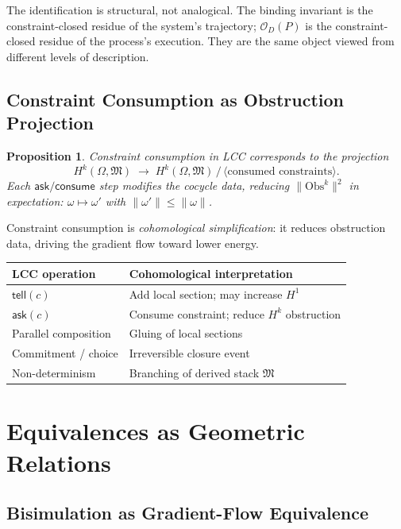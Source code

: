 \documentclass[11pt, letterpaper]{article}
\theoremstyle{plain}
\newtheorem{proposition}[theorem]{Proposition}
\theoremstyle{definition}
\theoremstyle{remark}
\newcommand{\MM}{\mathfrak{M}}
\newcommand{\OO}{\mathcal{O}}
\newcommand{\Obs}{\mathrm{Obs}}
\begin{document}
The identification is structural, not analogical. The binding invariant is the
constraint-closed residue of the system's trajectory; $\OO_D(P)$ is the
constraint-closed residue of the process's execution. They are the same object viewed
from different levels of description.

\subsection{Constraint Consumption as Obstruction Projection}

\begin{proposition}
Constraint consumption in LCC corresponds to the projection
\[
  H^k(\Omega, \MM) \;\longrightarrow\;
  H^k(\Omega, \MM)\,/\,\langle\text{consumed constraints}\rangle.
\]
Each $\mathsf{ask}/\mathsf{consume}$ step modifies the cocycle data, reducing
$\|\Obs^k\|^2$ in expectation:
$\omega \mapsto \omega'$ with $\|\omega'\| \leq \|\omega\|$.
\end{proposition}

Constraint consumption is \emph{cohomological simplification}: it reduces obstruction
data, driving the gradient flow toward lower energy.

\begin{center}
\begin{tabular}{@{}ll@{}}
\toprule
LCC operation & Cohomological interpretation \\
\midrule
$\mathsf{tell}(c)$ & Add local section; may increase $H^1$ \\
$\mathsf{ask}(c)$ & Consume constraint; reduce $H^k$ obstruction \\
Parallel composition & Gluing of local sections \\
Commitment / choice & Irreversible closure event \\
Non-determinism & Branching of derived stack $\MM$ \\
\bottomrule
\end{tabular}
\end{center}

\section{Equivalences as Geometric Relations}

\subsection{Bisimulation as Gradient-Flow Equivalence}
\end{document}
